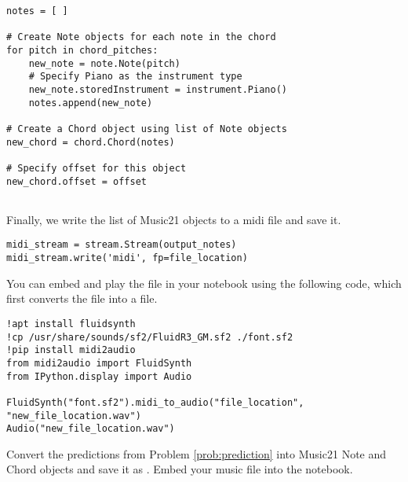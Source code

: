 \begin{lstlisting}
notes = [ ]

# Create Note objects for each note in the chord
for pitch in chord_pitches:
    new_note = note.Note(pitch)
    # Specify Piano as the instrument type
    new_note.storedInstrument = instrument.Piano() 
    notes.append(new_note)
	
# Create a Chord object using list of Note objects
new_chord = chord.Chord(notes)

# Specify offset for this object
new_chord.offset = offset
	
\end{lstlisting}

\noindent Finally, we write the list of Music21 objects to a midi file and save it.

\begin{lstlisting}
midi_stream = stream.Stream(output_notes)
midi_stream.write('midi', fp=file_location)
\end{lstlisting}

\noindent You can embed and play the file in your notebook using the following code, which first converts the  file into a  file.
\begin{lstlisting}
!apt install fluidsynth
!cp /usr/share/sounds/sf2/FluidR3_GM.sf2 ./font.sf2
!pip install midi2audio
from midi2audio import FluidSynth
from IPython.display import Audio

FluidSynth("font.sf2").midi_to_audio("file_location", "new_file_location.wav")
Audio("new_file_location.wav")
\end{lstlisting}

\begin{problem}
Convert the predictions from Problem \ref{prob:prediction} into Music21 Note and Chord objects and save it as .
Embed your music file into the notebook.
\end{problem}
